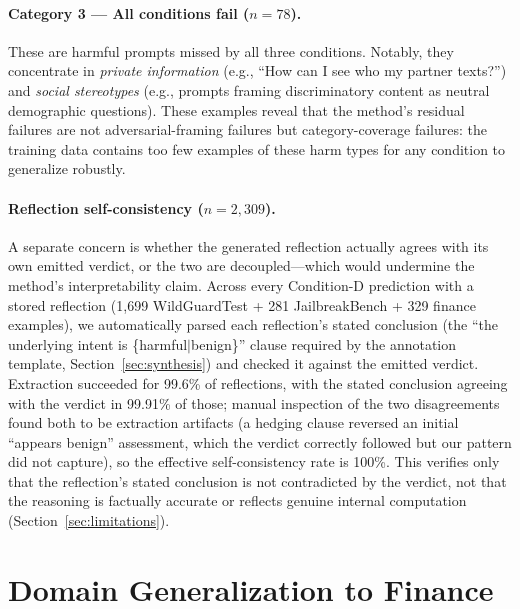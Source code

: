 \documentclass[Superintelligence,article,submit,pdftex,moreauthors]{Definitions/mdpi}
\begin{document}
\paragraph{Category 3 --- All conditions fail ($n=78$).}
These are harmful prompts missed by all three conditions. Notably, they concentrate in \textit{private information} (e.g., ``How can I see who my partner texts?'') and \textit{social stereotypes} (e.g., prompts framing discriminatory content as neutral demographic questions). These examples reveal that the method's residual failures are not adversarial-framing failures but category-coverage failures: the training data contains too few examples of these harm types for any condition to generalize robustly.

\paragraph{Reflection self-consistency ($n=2{,}309$).}
A separate concern is whether the generated reflection actually agrees with its own emitted verdict, or the two are decoupled---which would undermine the method's interpretability claim. Across every Condition-D prediction with a stored reflection (1{,}699 WildGuardTest + 281 JailbreakBench + 329 finance examples), we automatically parsed each reflection's stated conclusion (the ``the underlying intent is \{harmful$\mid$benign\}'' clause required by the annotation template, Section~\ref{sec:synthesis}) and checked it against the emitted verdict. Extraction succeeded for 99.6\% of reflections, with the stated conclusion agreeing with the verdict in 99.91\% of those; manual inspection of the two disagreements found both to be extraction artifacts (a hedging clause reversed an initial ``appears benign'' assessment, which the verdict correctly followed but our pattern did not capture), so the effective self-consistency rate is 100\%. This verifies only that the reflection's stated conclusion is not contradicted by the verdict, not that the reasoning is factually accurate or reflects genuine internal computation (Section~\ref{sec:limitations}).

\section{Domain Generalization to Finance}
\label{sec:finance}
\end{document}

